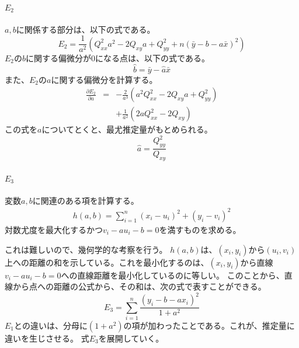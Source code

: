 \paragraph{$E_2$}
$a,b$に関係する部分は、以下の式である。
\begin{equation*}
 E_2 = \frac{1}{a^2}(Q^2_{xx}a^2-2Q_{xy}a+Q^2_{yy}+n(\bar{y}-b-a\bar{x})^2)
\end{equation*}
$E_2$の$b$に関する偏微分が$0$になる点は、以下の式である。
\begin{equation*}
 \hat{b} = \bar{y}-\hat{a}\bar{x}
\end{equation*}
また、$E_2$の$a$に関する偏微分を計算する。
\begin{eqnarray*}
 \frac{\partial E_2}{\partial a} &=& -\frac{2}{a^3}(a^2Q^2_{xx}-2Q_{xy}a+Q^2_{yy}) \\
& & +\frac{1}{a^2}(2aQ^2_{xx}-2Q_{xy})
\end{eqnarray*}
この式を$a$についてとくと、最尤推定量がもとめられる。
\begin{equation*}
 \hat{a}= \frac{Q^2_{yy}}{Q_{xy}}
\end{equation*}

\paragraph{$E_3$}

変数$a,b$に関連のある項を計算する。
\begin{eqnarray*}
 h(a,b) = \sum_{i=1}^n (x_i-u_i)^2+(y_i-v_i)^2
\end{eqnarray*}
対数尤度を最大化するかつ$v_i -a u_i -b = 0$を満すものを求める。

これは難しいので、幾何学的な考察を行う。
$h(a,b)$は、$(x_i,y_i)$から$(u_i,v_i)$上への距離の和を示している。これを最小化するのは、$(x_i,y_i)$から直線$v_i-a u_i-b=0$への直線距離を最小化しているのに等しい。
このことから、直線から点への距離の公式から、その和は、次の式で表すことができる。
\begin{equation*}
 E_3 = \sum_{i=1}^n \frac{ (y_i-b-ax_i)^2}{1+a^2}
\end{equation*}
$E_1$との違いは、分母に$(1+a^2)$の項が加わったことである。これが、推定量に違いを生じさせる。
式$E_3$を展開していく。

